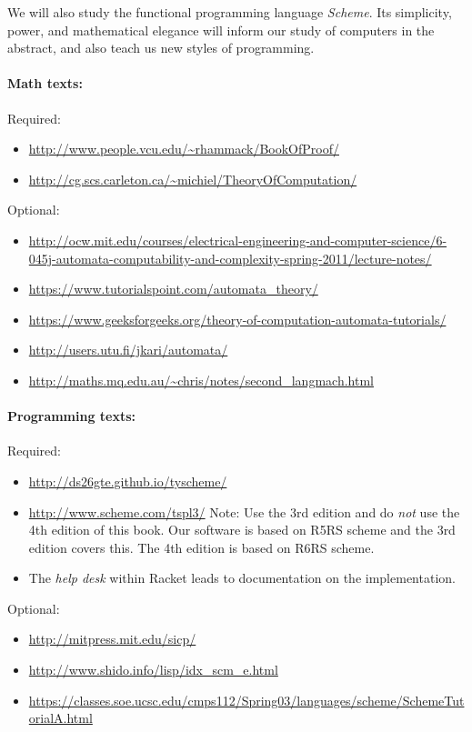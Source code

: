 \documentclass{article}
\begin{document}
  We will also study the functional programming language {\em Scheme}.
  Its simplicity, power, and mathematical elegance will inform our
  study of computers in the abstract, and also teach us new styles of
  programming.


  \paragraph{Math texts:} \mbox{}

  Required:
\begin{itemize}
\item \url{http://www.people.vcu.edu/~rhammack/BookOfProof/}
\item \url{http://cg.scs.carleton.ca/~michiel/TheoryOfComputation/}
\end{itemize}
 Optional:
\begin{itemize}
\item {\tiny \url{http://ocw.mit.edu/courses/electrical-engineering-and-computer-science/6-045j-automata-computability-and-complexity-spring-2011/lecture-notes/}}
\item
 \url{https://www.tutorialspoint.com/automata_theory/}
\item
 \url{https://www.geeksforgeeks.org/theory-of-computation-automata-tutorials/}
\item
 \url{http://users.utu.fi/jkari/automata/}
\item
 \url{http://maths.mq.edu.au/~chris/notes/second_langmach.html}
\end{itemize} 
\paragraph{Programming texts:} \mbox{}

Required:
\begin{itemize}
\item
      \url{http://ds26gte.github.io/tyscheme/} 
\item
  \url{http://www.scheme.com/tspl3/}  Note: Use the 3rd edition
  and do {\em not} use the
  4th edition of this book.  Our software is based on R5RS scheme and
  the 3rd edition covers this.  The 4th edition is based on R6RS scheme.
\item
 The {\em help desk} within Racket leads to documentation on
    the implementation.
\end{itemize}
    Optional:
\begin{itemize}
\item
    \url{http://mitpress.mit.edu/sicp/}
\item
  \url{http://www.shido.info/lisp/idx_scm_e.html}
\item
  \url{https://classes.soe.ucsc.edu/cmps112/Spring03/languages/scheme/SchemeTutorialA.html}
\end{itemize}
\end{document}

